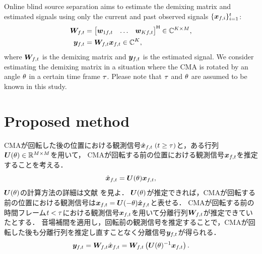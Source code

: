 \documentclass[twocolumn,9pt,dvipdfmx]{article}
\begin{document}
Online blind source separation aims to estimate the demixing matrix and estimated signals using only the current and past observed signals $\{\bm{x} _{f,i}\} _{i=1} ^{t}$:
\begin{align}
  \Demix _{\ft} &= \begin{bmatrix} \demix _{1\ft} & \dots & \demix _{\Src\ft} \end{bmatrix} ^{\hermite} \in \C ^{\Src \times \Mic}, \\
  \Est _{\ft} &= \Demix _{\ft} \Obs _{\ft} \in \C ^{\Src},
\end{align}
where $\Demix _{\ft}$ is the demixing matrix and $\Est _{\ft}$ is the estimated signal.
We consider estimating the demixing matrix in a situation where the CMA is rotated by an angle $\theta$ in a certain time frame $\tau$.
Please note that $\tau$ and $\theta$ are assumed to be known in this study.%

\section{Proposed method}

CMAが回転した後の位置における観測信号$\rotObs _{\ft}\; (\tframe \geq \rotFra)$と，ある行列$\bm{U} (\theta) \in \mathbb{R} ^{M\times M}$を用いて，
CMAが回転する前の位置における観測信号$\Obs _{\ft}$を推定することを考える．
\begin{equation}
  \rot{\Obs} _{\ft} = \rotMat (\rotDeg) \Obs _{\ft},
\end{equation}
$\bm{U} (\theta)$の計算方法の詳細は文献 \cite{Wakabayashi:2020:ASJ:A} を見よ．
$\bm{U} (\theta)$が推定できれば，CMAが回転する前の位置における観測信号は$\Obs _{\ft} = \rotMat (-\rotDeg) \rot{\Obs} _{\ft}$と表せる．
CMAが回転する前の時間フレーム$t < \tau$における観測信号$\Obs _{\ft}$を用いて分離行列$\Demix _{\ft}$が推定できていたとする．
音場補間を適用し，回転前の観測信号を推定することで，CMAが回転した後も分離行列を推定し直すことなく分離信号$\Est _{\ft}$が得られる．
\begin{equation}
  \Est _{\ft} = \Demix _{\ft} \rotObs _{\ft} = \Demix _{\ft} \left(\rotMat (\rotDeg)^{-1} \Obs _{\ft}\right).
\end{equation}
\end{document}
